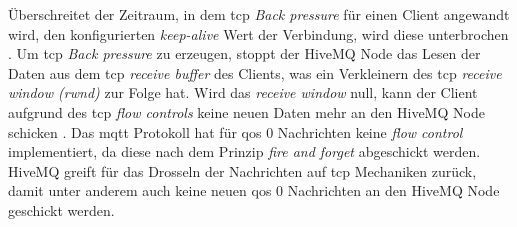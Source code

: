 Überschreitet der Zeitraum, in dem \ac{tcp} \textit{Back pressure} für einen Client angewandt wird, den konfigurierten \textit{keep-alive} Wert der Verbindung, wird diese unterbrochen \cite{ClusterOverloadProtection}.
Um \ac{tcp} \textit{Back pressure} zu erzeugen, stoppt der HiveMQ Node das Lesen der Daten aus dem \ac{tcp} \textit{receive buffer} des Clients, was ein Verkleinern des \ac{tcp} \textit{receive window (rwnd)} zur Folge hat. Wird das \textit{receive window} null, kann der Client aufgrund des \ac{tcp} \textit{flow controls} keine neuen Daten mehr an den HiveMQ Node schicken \cite{TCPFlowControl}.
Das \ac{mqtt} Protokoll hat für \ac{qos} 0 Nachrichten keine \textit{flow control} implementiert, da diese nach dem Prinzip \textit{fire and forget} abgeschickt werden.
HiveMQ greift für das Drosseln der Nachrichten auf \ac{tcp} Mechaniken zurück, damit unter anderem auch keine neuen \ac{qos} 0 Nachrichten an den HiveMQ Node geschickt werden.

